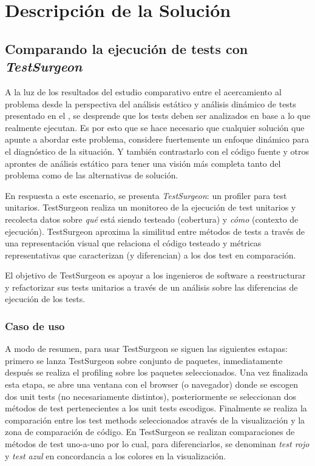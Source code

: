 \chapter{Descripción de la Solución}



\section{Comparando la ejecución de tests con \emph{TestSurgeon}}

\par A la luz de los resultados del estudio comparativo entre el acercamiento al problema desde la perspectiva del análisis estático y análisis dinámico de  tests presentado en el , se desprende que los tests deben ser analizados en base a lo que realmente ejecutan. Es por esto que se hace necesario que cualquier solución que apunte a abordar este problema, considere fuertemente un enfoque dinámico para el diagnóstico de la situación. Y también contrastarlo con el código fuente y otros aprontes de análisis estático para tener una visión más completa tanto del problema como de las alternativas de solución. 

\par En respuesta a este escenario, se presenta \emph{TestSurgeon}: un profiler para test unitarios. TestSurgeon realiza un monitoreo de la ejecución de test unitarios y recolecta datos sobre \emph{qué} está siendo testeado (cobertura) y \emph{cómo} (contexto de ejecución). TestSurgeon aproxima la similitud entre métodos de tests a través de una representación visual que relaciona el código testeado y métricas representativas que caracterizan (y diferencian) a los dos test en comparación. 

\par El objetivo de TestSurgeon es apoyar a los ingenieros de software a reestructurar y refactorizar sus tests unitarios a través de un análisis sobre las diferencias de ejecución de los tests.

\subsection{Caso de uso}
\par A modo de resumen, para usar TestSurgeon se siguen las siguientes estapas: primero se lanza TestSurgeon sobre conjunto de paquetes, inmediatamente después se realiza el profiling sobre los paquetes seleccionados. Una vez finalizada esta etapa, se abre una ventana con el browser (o navegador) donde se escogen dos unit tests (no necesariamente distintos), posteriormente se seleccionan dos métodos de test pertenecientes a los unit tests escodigos. Finalmente se realiza la comparación entre los test methods seleccionados através de la visualización y la zona de comparación de código. En TestSurgeon se realizan comparaciones de métodos de test uno-a-uno por lo cual, para diferenciarlos, se denominan \emph{test rojo} y \emph{test azul} en concordancia a los colores en la visualización.


